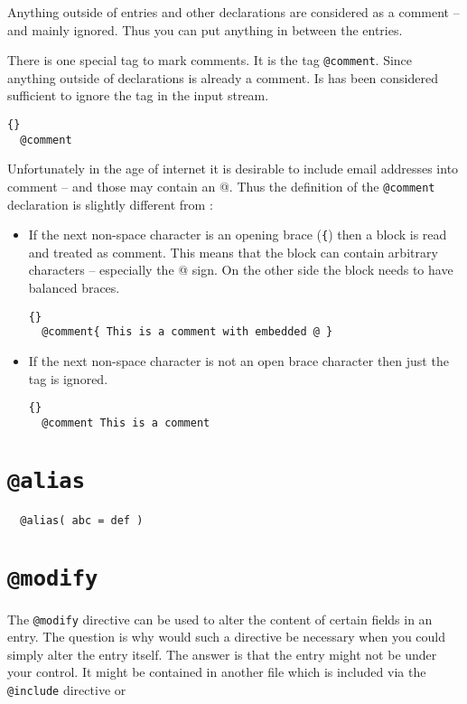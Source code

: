 Anything outside of entries and other declarations are considered as a
comment -- and mainly ignored. Thus you can put anything in between
the entries.

 There is one special tag to mark comments. It is the tag
\texttt{@comment}. Since anything outside of declarations is already a
comment. Is has been considered sufficient to ignore the tag in the
input stream.
\begin{lstlisting}{}
  @comment
\end{lstlisting}

Unfortunately in the age of internet it is desirable to include email
addresses into comment -- and those may contain an @. Thus the
definition of the \texttt{@comment} declaration is slightly different
from \BibTeX:
\begin{itemize}
\item If the next non-space character is an opening brace (\verb|{|)
  then a block is read and treated as comment. This means that the
  block can contain arbitrary characters -- especially the @ sign.
  On the other side the block needs to have balanced braces.
\begin{lstlisting}{}
  @comment{ This is a comment with embedded @ }
\end{lstlisting}
    
\item If the next non-space character is not an open brace character
  then just the tag is ignored.
\begin{lstlisting}{}
  @comment This is a comment
\end{lstlisting}
  
\end{itemize}


\section{\texttt{@alias}}

\begin{verbatim}
  @alias( abc = def )
\end{verbatim}

\INCOMPLETE

\section{\texttt{@modify}}
The \texttt{@modify} directive can be used to alter the content of
certain fields in an entry. The question is why would such a directive
be necessary when you could simply alter the entry itself. The answer
is that the entry might not be under your control. It might be
contained in another file which is included via the \texttt{@include}
directive or

